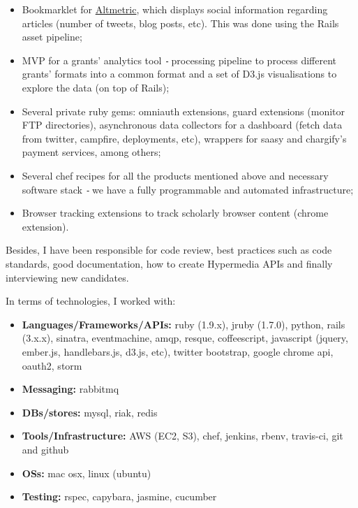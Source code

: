 \documentclass{res}
\def\Minus{\texttt{-}\,}
\begin{document}
\begin{resume}
\begin{itemize}
\begin{itemize}
        \item Bookmarklet for \href{http://www.altmetric.com/bookmarklet.php}{Altmetric}, which displays social information regarding articles (number of tweets, blog posts, etc). This was done using the Rails asset pipeline;
        \item MVP for a grants’ analytics tool \Minus processing pipeline to process different grants’ formats into a common format and a set of D3.js visualisations to explore the data (on top of Rails);
        \item Several private ruby gems: omniauth extensions, guard extensions (monitor FTP directories), asynchronous data collectors for a dashboard (fetch data from twitter, campfire, deployments, etc), wrappers for saasy and chargify’s payment services, among others;
        \item Several chef recipes for all the products mentioned above and necessary software stack \Minus we have a fully programmable and automated infrastructure;
        \item Browser tracking extensions to track scholarly browser content (chrome extension).
        \end{itemize}
      Besides, I have been responsible for code review, best practices such as code standards, good documentation, how to create Hypermedia APIs and finally interviewing new candidates.

      In terms of technologies, I worked with:
      \begin{itemize}
        \item[] {\bf Languages/Frameworks/APIs:} ruby (1.9.x), jruby (1.7.0), python, rails (3.x.x), sinatra, eventmachine, amqp, resque, coffeescript, javascript (jquery, ember.js, handlebars.js, d3.js, etc), twitter bootstrap, google chrome api, oauth2, storm
        \item[] {\bf Messaging:} rabbitmq
        \item[] {\bf DBs/stores:} mysql, riak, redis
        \item[] {\bf Tools/Infrastructure:} AWS (EC2, S3), chef, jenkins, rbenv, travis-ci, git and github
        \item[] {\bf OSs:} mac osx, linux (ubuntu)
        \item[] {\bf Testing:} rspec, capybara, jasmine, cucumber
      \end{itemize}


\end{itemize}
\end{resume}
\end{document}
